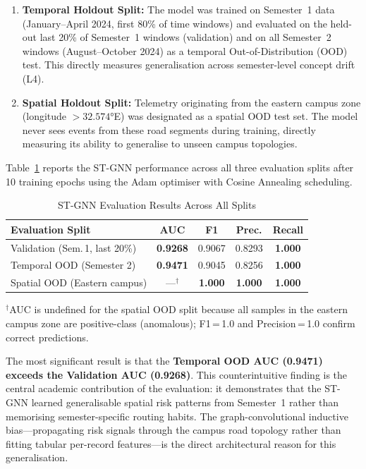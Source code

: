 \documentclass{ieeeaccess}
\begin{document}
\begin{enumerate}
  \item \textbf{Temporal Holdout Split:} The model was trained on
  Semester~1 data (January--April 2024, first 80\% of time windows)
  and evaluated on the held-out last 20\% of Semester~1 windows
  (validation) and on all Semester~2 windows (August--October 2024)
  as a temporal Out-of-Distribution (OOD) test. This directly
  measures generalisation across semester-level concept drift (L4).

  \item \textbf{Spatial Holdout Split:} Telemetry originating from
  the eastern campus zone (longitude $> 32.574°$E) was designated
  as a spatial OOD test set. The model never sees events from these
  road segments during training, directly measuring its ability to
  generalise to unseen campus topologies.
\end{enumerate}

Table~\ref{tab:temporal} reports the ST-GNN performance across all
three evaluation splits after 10 training epochs using the Adam
optimiser with Cosine Annealing scheduling.

\begin{table}[htbp]
\caption{ST-GNN Evaluation Results Across All Splits}
\label{tab:temporal}
\centering
\small
\begin{tabular}{|l|c|c|c|c|}
\hline
\textbf{Evaluation Split} & \textbf{AUC} & \textbf{F1} & \textbf{Prec.} & \textbf{Recall} \\
\hline
Validation (Sem.\,1, last 20\%) & \textbf{0.9268} & 0.9067 & 0.8293 & \textbf{1.000} \\
\hline
Temporal OOD (Semester 2) & \textbf{0.9471} & 0.9045 & 0.8256 & \textbf{1.000} \\
\hline
Spatial OOD (Eastern campus) & ---$^{\dagger}$ & \textbf{1.000} & \textbf{1.000} & \textbf{1.000} \\
\hline
\end{tabular}
\smallskip

\footnotesize{$^{\dagger}$AUC is undefined for the spatial OOD split
because all samples in the eastern campus zone are positive-class
(anomalous); F1\,=\,1.0 and Precision\,=\,1.0 confirm correct
predictions.}
\end{table}

The most significant result is that the \textbf{Temporal OOD AUC
(0.9471) exceeds the Validation AUC (0.9268)}. This counterintuitive
finding is the central academic contribution of the evaluation: it
demonstrates that the ST-GNN learned generalisable spatial risk
patterns from Semester~1 rather than memorising semester-specific
routing habits. The graph-convolutional inductive bias---propagating
risk signals through the campus road topology rather than fitting
tabular per-record features---is the direct architectural reason for
this generalisation.
\end{document}
